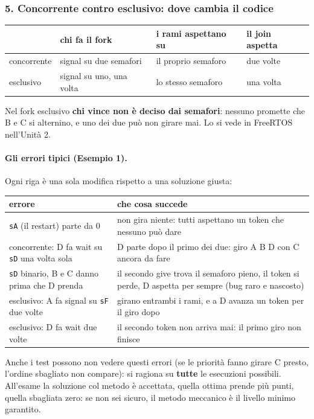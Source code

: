 \subsubsection*{5. Concorrente contro esclusivo: dove cambia il codice}
\begin{center}
\small
\begin{tabular}{l P{0.27} P{0.27} P{0.17}}
    \hline
    & \textbf{chi fa il fork} & \textbf{i rami aspettano su} & \textbf{il join aspetta} \\
    \hline
    concorrente & signal su due semafori & il proprio semaforo & due volte \\
    esclusivo & signal su uno, una volta & lo stesso semaforo & una volta \\
    \hline
\end{tabular}
\end{center}
Nel fork esclusivo \textbf{chi vince non è deciso dai semafori}: nessuno promette che B e C si alternino, e uno dei due può non girare mai. Lo si vede in FreeRTOS nell'Unità 2.

\paragraph*{Gli errori tipici (Esempio 1).} Ogni riga è una sola modifica rispetto a una soluzione giusta:
\begin{center}
\small
\begin{tabular}{P{0.4} P{0.5}}
    \hline
    \textbf{errore} & \textbf{che cosa succede} \\
    \hline
    \texttt{sA} (il restart) parte da 0 & non gira niente: tutti aspettano un token che nessuno può dare \\
    concorrente: D fa wait su \texttt{sD} una volta sola & D parte dopo il primo dei due: giro A B D con C ancora da fare \\
    \texttt{sD} binario, B e C danno prima che D prenda & il secondo give trova il semaforo pieno, il token si perde, D aspetta per sempre (bug raro e nascosto) \\
    esclusivo: A fa signal su \texttt{sF} due volte & girano entrambi i rami, e a D avanza un token per il giro dopo \\
    esclusivo: D fa wait due volte & il secondo token non arriva mai: il primo giro non finisce \\
    \hline
\end{tabular}
\end{center}
Anche i test possono non vedere questi errori (se le priorità fanno girare C presto, l'ordine sbagliato non compare): si ragiona su \textbf{tutte} le esecuzioni possibili. All'esame la soluzione col metodo è accettata, quella ottima prende più punti, quella sbagliata zero: se non sei sicuro, il metodo meccanico è il livello minimo garantito.

